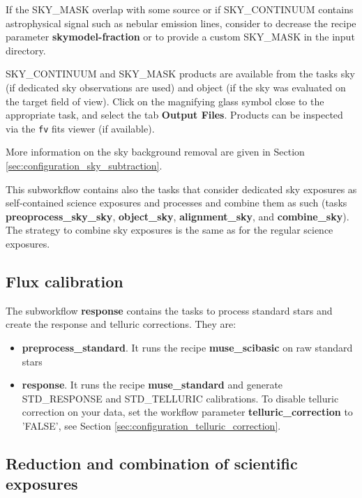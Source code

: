 If the SKY\_MASK overlap with some source or if SKY\_CONTINUUM contains astrophysical signal such as nebular emission lines, 
consider to decrease the recipe parameter {\bf skymodel-fraction} or to provide a custom SKY\_MASK in the input directory.

SKY\_CONTINUUM and SKY\_MASK products are available from the tasks sky (if dedicated sky observations are used) and 
object (if the sky was evaluated on the target field of view). Click on the magnifying glass
symbol close to the appropriate task, and select the tab {\bf Output Files}. Products can be inspected via the {\tt fv} fits 
viewer (if available).

More information on the sky background removal are given
in Section \ref{sec:configuration_sky_subtraction}.



This subworkflow contains also the tasks that consider dedicated sky exposures as self-contained science exposures and
processes and combine them as such
(tasks {\bf preoprocess\_sky\_sky}, {\bf object\_sky}, {\bf alignment\_sky}, and {\bf combine\_sky}).
The strategy to combine sky exposures is the same as for the regular science exposures.

\subsection{Flux calibration}

The subworkflow {\bf response} contains the tasks to process standard stars and create the response and telluric
corrections. They are:

\begin{itemize}
\item {\bf preprocess\_standard}. It runs the recipe {\bf muse\_scibasic} on raw standard stars

 \item {\bf response}. It runs the recipe {\bf muse\_standard} and
   generate STD\_RESPONSE and STD\_TELLURIC calibrations. To disable
   telluric correction on your data, set the workflow parameter {\bf
     telluric\_correction} to 'FALSE', see Section
   \ref{sec:configuration_telluric_correction}.

\end{itemize}

\subsection{Reduction and combination of scientific exposures}

